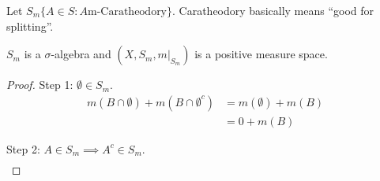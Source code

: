 Let $S_m \{ A \in S : A \textrm{m-Caratheodory}\}$. Caratheodory basically means ``good for splitting''.

\begin{theorem}
	$S_m$ is a $\sigma$-algebra and $(X, S_m, m|_{S_m})$ is a positive measure space.
\end{theorem}

\begin{proof}
	Step 1: $\emptyset \in S_m$. 
	\begin{align*}
		m(B \cap \emptyset) + m(B \cap \emptyset^c) & = m(\emptyset) + m(B) \\
																								& = 0 + m(B)
	\end{align*}

	Step 2: $A \in S_m \implies A^c \in S_m$.
	\begin{align*}
	  
	\end{align*}
\end{proof}

